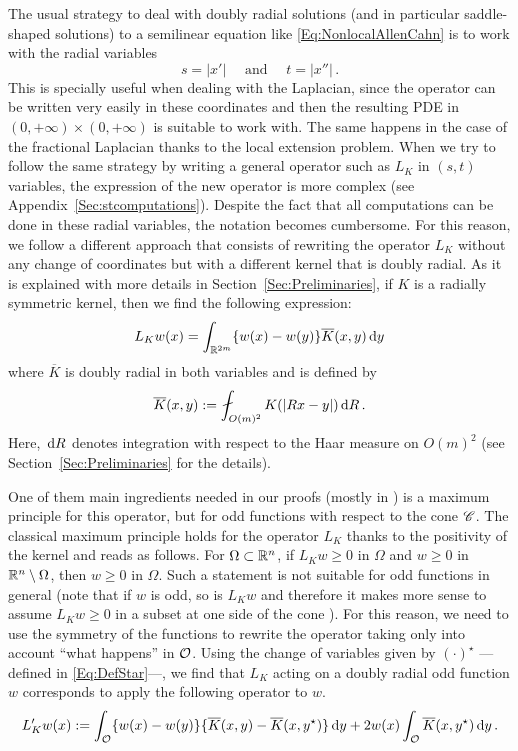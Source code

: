 The usual strategy to deal with doubly radial solutions (and in particular saddle-shaped solutions) to a semilinear equation like \eqref{Eq:NonlocalAllenCahn} is to work with the radial variables 
$$
s = |x'| \quad \text{ and } \quad t=|x''|\,.
$$
This is specially useful when dealing with the Laplacian, since the operator can be written very easily in these coordinates and then the resulting PDE in $(0,+\infty)\times (0,+\infty)$ is suitable to work with. The same happens in the case of the fractional Laplacian thanks to the local extension problem. When we try to follow the same strategy by writing a general operator such as $L_K$ in $(s,t)$ variables, the expression of the new operator is more complex (see Appendix~\ref{Sec:stcomputations}). Despite the fact that all computations can be done in these radial variables, the notation becomes cumbersome. For this reason, we follow a different approach that consists of rewriting the operator $L_K$ without any change of coordinates but with a different kernel that is doubly radial. As it is explained with more details in Section~\ref{Sec:Preliminaries}, if $K$ is a radially symmetric kernel, then we find the following expression:
$$
L_K w(x) = \int_{\mathbb{R}^{2m}} \{w(x) - w(y)\} \overline{K}(x,y) \,\mathrm{d} y
$$
where $\overline{K}$ is doubly radial in both variables and is defined by
\begin{equation}
\label{Eq:KbarDef'}
\overline{K}(x,y) := \average_{O(m)^2} K(|Rx - y|)\d R\,.
\end{equation}
Here, $\,\mathrm{d} R$ denotes integration with respect to the Haar measure on $O(m)^2$ (see Section~\ref{Sec:Preliminaries} for the details).


One of them main ingredients needed in our proofs (mostly in \cite{FelipeSanz-Perela:IntegroDifferentialII}) is a maximum principle for this operator, but for odd functions with respect to the cone $\mathscr{C}$. The classical maximum principle holds for the operator $L_K$ thanks to the positivity of the kernel and reads as follows. For $\Omega \subset \mathbb{R}^n$, if $L_K w \geq 0$ in $\Omega$ and $w \geq 0$ in $\mathbb{R}^n \setminus \Omega$, then $w\geq 0$ in $\Omega$. Such a statement is not suitable for odd functions in general (note that if $w$ is odd, so is $L_K w$ and therefore it makes more sense to assume $L_K w \geq 0$ in a subset  at one side of the cone ). For this reason, we need to use the symmetry of the functions to rewrite the operator taking only into account ``what happens'' in $\mathcal{O}$. Using the change of variables given by $(\cdot)^\star$ ---defined in \eqref{Eq:DefStar}---, we find that $L_K$ acting on a doubly radial odd function $w$ corresponds to apply the following operator to $w$. 
\begin{equation}
	L_K' w (x) := \int_{\mathcal{O}} \{w(x) - w(y) \} \{\overline{K}(x, y) - \overline{K}(x, y^\star)  \} \,\mathrm{d} y +  2 w(x) \int_{\mathcal{O}} \overline{K}(x, y^\star) \,\mathrm{d} y \,.
\end{equation}


